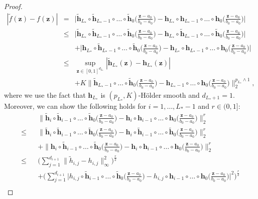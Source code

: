 \documentclass[11pt, preprint]{imsart}
\numberwithin{equation}{section}
\def \bfz{\mathbf{z}}
\def \bfh{\mathbf{h}}
\theoremstyle{plain}
\theoremstyle{definition}
\begin{document}
\begin{proof}
\begin{eqnarray*}
	|\widetilde{f}(\bfz)-{f}(\bfz)|&=&\bigg|\widetilde{\bfh}_{L_*}\circ \widetilde{\bfh}_{L_*-1}\circ\ldots\circ \widetilde{\bfh}_0\bigg(\frac{\bfz-a_0}{b_0-a_0}\bigg)-\bfh_{L_*}\circ \bfh_{L_*-1}\circ\ldots\circ \bfh_0\bigg(\frac{\bfz-a_0}{b_0-a_0}\bigg)\bigg|\nonumber\\
	&\leq& \bigg|\widetilde{\bfh}_{L_*}\circ \widetilde{\bfh}_{L_*-1}\circ\ldots\circ \widetilde{\bfh}_0\bigg(\frac{\bfz-a_0}{b_0-a_0}\bigg)-\bfh_{L_*}\circ \widetilde{\bfh}_{L_*-1}\circ\ldots\circ \widetilde{\bfh}_0\bigg(\frac{\bfz-a_0}{b_0-a_0}\bigg)\bigg|\nonumber\\
	&&+\bigg|{\bfh}_{L_*}\circ \widetilde{\bfh}_{L_*-1}\circ\ldots\circ \widetilde{\bfh}_0\bigg(\frac{\bfz-a_0}{b_0-a_0}\bigg)-\bfh_{L_*}\circ \bfh_{L_*-1}\circ\ldots\circ \bfh_0\bigg(\frac{\bfz-a_0}{b_0-a_0}\bigg)\bigg|\nonumber\\
	&\leq& \sup_{\bfz \in [0, 1]^{d_{L_*}}}|\widetilde{\bfh}_{L_*}(\bfz)-\bfh_{L_*}(\bfz)|\nonumber\\
	&&+K\bigg\|\widetilde{\bfh}_{L_*-1}\circ\ldots\circ \widetilde{\bfh}_0\bigg(\frac{\bfz-a_0}{b_0-a_0}\bigg)-\bfh_{L_*-1}\circ\ldots\circ \bfh_0\bigg(\frac{\bfz-a_0}{b_0-a_0}\bigg)\bigg\|_2^{p_{L_*} \wedge 1},
\end{eqnarray*}
where we use the fact that $\bfh_{L_*}$ is $(p_{L_*}, K)$-H\" older smooth and $d_{L_*+1}=1$. Moreover, we can show the following holds for  $i=1,\ldots, L_*-1$ and $r\in (0, 1]$:
\begin{eqnarray*}
	&&\bigg\|\widetilde{\bfh}_{i}\circ\widetilde{\bfh}_{i-1}\circ\ldots\circ \widetilde{\bfh}_0\bigg(\frac{\bfz-a_0}{b_0-a_0}\bigg)-\bfh_{i}\circ\bfh_{i-1}\circ\ldots\circ \bfh_0\bigg(\frac{\bfz-a_0}{b_0-a_0}\bigg)\bigg\|_2^{r}\nonumber\\
	\leq&&\bigg\|\widetilde{\bfh}_{i}\circ\widetilde{\bfh}_{i-1}\circ\ldots\circ \widetilde{\bfh}_0\bigg(\frac{\bfz-a_0}{b_0-a_0}\bigg)-\bfh_{i}\circ\widetilde{\bfh}_{i-1}\circ\ldots\circ \widetilde{\bfh}_0\bigg(\frac{\bfz-a_0}{b_0-a_0}\bigg)\bigg\|_2^{r}\nonumber\\\
&&+\bigg\|{\bfh}_{i}\circ\widetilde{\bfh}_{i-1}\circ\ldots\circ \widetilde{\bfh}_0\bigg(\frac{\bfz-a_0}{b_0-a_0}\bigg)-\bfh_{i}\circ\bfh_{i-1}\circ\ldots\circ \bfh_0\bigg(\frac{\bfz-a_0}{b_0-a_0}\bigg)\bigg\|_2^{r}\nonumber\\	
\leq&& \bigg(\sum_{j=1}^{d_{i+1}}\|\widetilde{h}_{i,j}-h_{i,j}\|^2_\infty\bigg)^{\frac{r}{2}}\nonumber\\
&&+\bigg(\sum_{j=1}^{d_{i+1}}\bigg|h_{i,j}\circ\widetilde{\bfh}_{i-1}\circ\ldots\circ \widetilde{\bfh}_0\bigg(\frac{\bfz-a_0}{b_0-a_0}\bigg)-h_{i,j}\circ\bfh_{i-1}\circ\ldots\circ \bfh_0\bigg(\frac{\bfz-a_0}{b_0-a_0}\bigg)\bigg|^2\bigg)^{\frac{r}{2}}\nonumber\\

\end{eqnarray*}
\end{proof}
\end{document}
